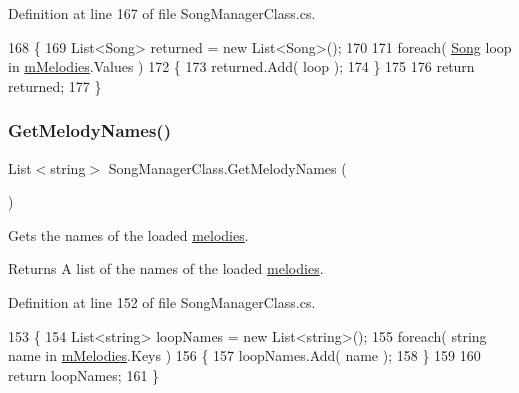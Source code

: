 Definition at line 167 of file Song\+Manager\+Class.\+cs.


\begin{DoxyCode}
168     \{
169         List<Song> returned = \textcolor{keyword}{new} List<Song>();
170 
171         \textcolor{keywordflow}{foreach}( \hyperlink{class_song}{Song} loop \textcolor{keywordflow}{in} \hyperlink{group___s_m_priv_var_ga935e80f645d0546003f7df8443b79242}{mMelodies}.Values )
172         \{
173             returned.Add( loop );
174         \}
175 
176         \textcolor{keywordflow}{return} returned;
177     \}
\end{DoxyCode}
\mbox{\label{group___s_m_pub_func_ga59df8468ac771fc8eb1a5f2025e6c5a8}} 
\subsubsection{\texorpdfstring{Get\+Melody\+Names()}{GetMelodyNames()}}
{\footnotesize\ttfamily List$<$string$>$ Song\+Manager\+Class.\+Get\+Melody\+Names (\begin{DoxyParamCaption}{ }\end{DoxyParamCaption})}



Gets the names of the loaded \hyperlink{group___song_group_DocSongMelody}{melodies}. 

\begin{DoxyReturn}{Returns}
A list of the names of the loaded \hyperlink{group___song_group_DocSongMelody}{melodies}. 
\end{DoxyReturn}


Definition at line 152 of file Song\+Manager\+Class.\+cs.


\begin{DoxyCode}
153     \{
154         List<string> loopNames = \textcolor{keyword}{new} List<string>();
155         \textcolor{keywordflow}{foreach}( \textcolor{keywordtype}{string} name \textcolor{keywordflow}{in} \hyperlink{group___s_m_priv_var_ga935e80f645d0546003f7df8443b79242}{mMelodies}.Keys )
156         \{
157             loopNames.Add( name );
158         \}
159 
160         \textcolor{keywordflow}{return} loopNames;
161     \}
\end{DoxyCode}
\mbox{\label{group___s_m_pub_func_gac41e94dbaa3f2db83a6d86466526f76c}} 
